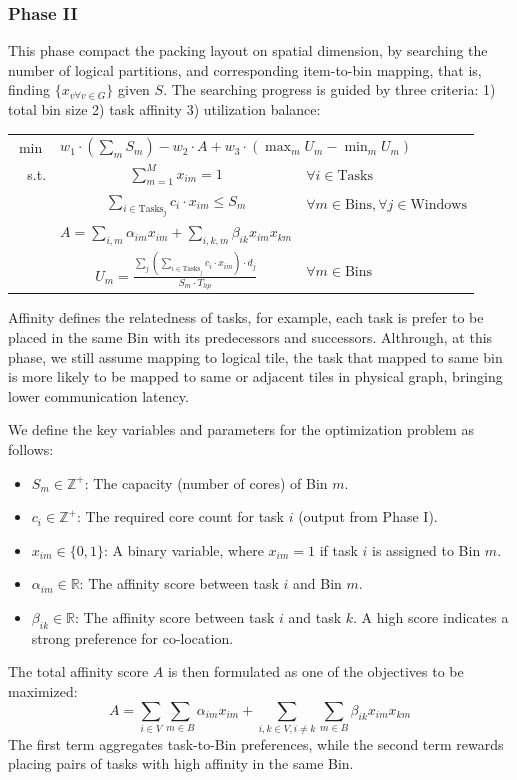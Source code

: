 \subsubsection{Phase II}
This phase compact the packing layout on spatial dimension, by searching the number of logical partitions, and corresponding item-to-bin mapping, that is, finding $\{x_{v \forall v \in G}\}$ given $S$. The searching progress is guided by three criteria: 1) total bin size 2) task affinity 3) utilization balance: 
\begin{center}
  \begin{tabular}{r c l}
  \(\min\) & \multicolumn{2}{l}{\(w_1 \cdot (\sum_{m} S_m) - w_2 \cdot A + w_3 \cdot (\max_m U_m - \min_m U_m)\)} \\
  s.t. & \(\sum_{m=1}^{M} x_{im} = 1\) & \(\forall i \in \text{Tasks}\) \\
  & \(\sum_{i \in \text{Tasks}_j} c_i \cdot x_{im} \leq S_m\) & \(\forall m \in \text{Bins}, \forall j \in \text{Windows}\) \\
  & \(A = \sum_{i,m} \alpha_{im} x_{im} + \sum_{i,k,m} \beta_{ik} x_{im} x_{km}\) & \\
  & \(U_m = \frac{\sum_{j} (\sum_{i \in \text{Tasks}_j} c_i \cdot x_{im}) \cdot d_j}{S_m \cdot T_{hp}}\) & \(\forall m \in \text{Bins}\)
  \end{tabular}
  \end{center}
Affinity defines the relatedness of tasks, for example, each task is prefer to be placed in the same Bin with its predecessors and successors. Althrough, at this phase, we still assume mapping to logical tile, the task that mapped to same bin is more likely to be mapped to same or adjacent tiles in physical graph, bringing lower communication latency. 


We define the key variables and parameters for the optimization problem as follows:
\begin{itemize}
    \item $S_m \in \mathbb{Z}^+$: The capacity (number of cores) of Bin $m$.
    \item $c_i \in \mathbb{Z}^+$: The required core count for task $i$ (output from Phase I).
    \item $x_{im} \in \{0, 1\}$: A binary variable, where $x_{im}=1$ if task $i$ is assigned to Bin $m$.
    \item $\alpha_{im} \in \mathbb{R}$: The affinity score between task $i$ and Bin $m$.
    \item $\beta_{ik} \in \mathbb{R}$: The affinity score between task $i$ and task $k$. A high score indicates a strong preference for co-location.
\end{itemize}
The total affinity score $A$ is then formulated as one of the objectives to be maximized:
$$ A = \sum_{i \in V} \sum_{m \in B} \alpha_{im} x_{im} + \sum_{i,k \in V, i \neq k} \sum_{m \in B} \beta_{ik} x_{im} x_{km} $$
The first term aggregates task-to-Bin preferences, while the second term rewards placing pairs of tasks with high affinity in the same Bin.

